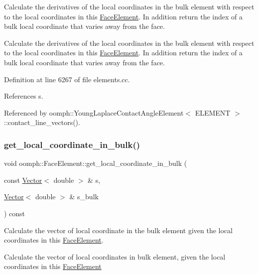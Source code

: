Calculate the derivatives of the local coordinates in the bulk element with respect to the local coordinates in this \hyperlink{classoomph_1_1FaceElement}{Face\+Element}. In addition return the index of a bulk local coordinate that varies away from the face. 

Calculate the derivatives of the local coordinates in the bulk element with respect to the local coordinates in this \hyperlink{classoomph_1_1FaceElement}{Face\+Element}. In addition return the index of a bulk local coordinate that varies away from the face. 

Definition at line 6267 of file elements.\+cc.



References s.



Referenced by oomph\+::\+Young\+Laplace\+Contact\+Angle\+Element$<$ E\+L\+E\+M\+E\+N\+T $>$\+::contact\+\_\+line\+\_\+vectors().

\mbox{\label{classoomph_1_1FaceElement_aced9ec5b182220c0f50b1714638ee8f3}} 
\subsubsection{\texorpdfstring{get\+\_\+local\+\_\+coordinate\+\_\+in\+\_\+bulk()}{get\_local\_coordinate\_in\_bulk()}}
{\footnotesize\ttfamily void oomph\+::\+Face\+Element\+::get\+\_\+local\+\_\+coordinate\+\_\+in\+\_\+bulk (\begin{DoxyParamCaption}\item[{const \hyperlink{classoomph_1_1Vector}{Vector}$<$ double $>$ \&}]{s,  }\item[{\hyperlink{classoomph_1_1Vector}{Vector}$<$ double $>$ \&}]{s\+\_\+bulk }\end{DoxyParamCaption}) const}



Calculate the vector of local coordinate in the bulk element given the local coordinates in this \hyperlink{classoomph_1_1FaceElement}{Face\+Element}. 

Calculate the vector of local coordinates in bulk element, given the local coordinates in this \hyperlink{classoomph_1_1FaceElement}{Face\+Element} 

